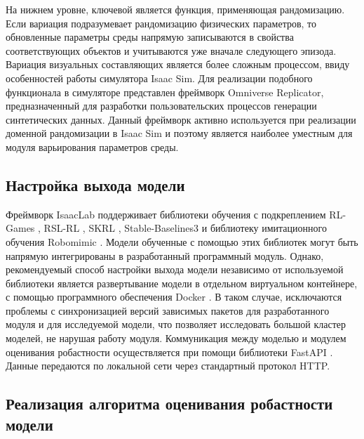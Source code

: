             На нижнем уровне, ключевой является функция, применяющая рандомизацию. Если вариация подразумевает рандомизацию физических параметров, то обновленные параметры среды напрямую записываются в свойства соответствующих объектов и учитываются уже вначале следующего эпизода. Вариация визуальных составляющих является более сложным процессом, ввиду особенностей работы симулятора Isaac Sim. Для реализации подобного функционала в симуляторе представлен фреймворк Omniverse Replicator, предназначенный для разработки пользовательских процессов генерации синтетических данных. Данный фреймворк активно используется при реализации доменной рандомизации в Isaac Sim и поэтому является наиболее уместным для модуля варьирования параметров среды. 
            
        \subsection{Настройка выхода модели}

            Фреймворк IsaacLab поддерживает библиотеки обучения с подкреплением RL-Games \cite{rl-games2021}, RSL-RL \cite{rudin2022learning}, SKRL \cite{serrano2023skrl}, Stable-Baselines3 \cite{stable-baselines3} и библиотеку имитационного обучения Robomimic \cite{robomimic2021}. Модели обученные с помощью этих библиотек могут быть напрямую интегрированы в разработанный программный модуль. Однако, рекомендуемый способ настройки выхода модели независимо от используемой библиотеки является развертывание модели в отдельном виртуальном контейнере, с помощью программного обеспечения Docker \cite{merkel2014docker}. В таком случае, исключаются проблемы с синхронизацией версий зависимых пакетов для разработанного модуля и для исследуемой модели, что позволяет исследовать большой кластер моделей, не нарушая работу модуля. Коммуникация между моделью и модулем оценивания робастности осуществляется при помощи библиотеки FastAPI \cite{Ramirez_FastAPI}. Данные передаются по локальной сети через стандартный протокол HTTP.

        \subsection{Реализация алгоритма оценивания робастности модели}

